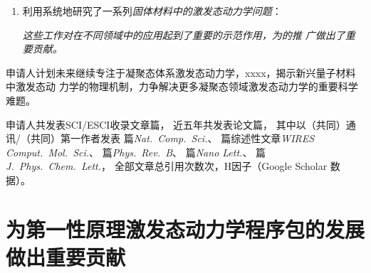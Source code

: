 \begin{enumerate}
\item 利用\hnamd{}系统地研究了一系列\emph{固体材料中的激发态动力学问题}：
  \emph{这些工作对\hnamd{}在不同领域中的应用起到了重要的示范作用，为\hnamd{}的推
    广做出了重要贡献。}
\end{enumerate}

申请人计划未来继续专注于凝聚态体系激发态动力学，xxxx，揭示新兴量子材料中激发态动
力学的物理机制，力争解决更多凝聚态领域激发态动力学的重要科学难题。


申请人共发表SCI/ESCI收录文章篇，%
{
  近五年共发表论文篇，
  其中以（共同）通讯/（共同）第一作者发表
  篇{\itshape Nat.\ Comp.\ Sci.}、
  篇综述性文章{\itshape WIRES Comput.\ Mol.\ Sci.}、
  篇{\itshape Phys.\ Rev.\ B}、
  篇{\itshape Nano Lett.}、
  篇{\itshape J.\ Phys.\ Chem.\ Lett.}，
  全部文章总引用次数次，H因子（Google Scholar 数据）。
}

\section{为第一性原理激发态动力学程序包\hnamd{}的发展做出重要贡献}

